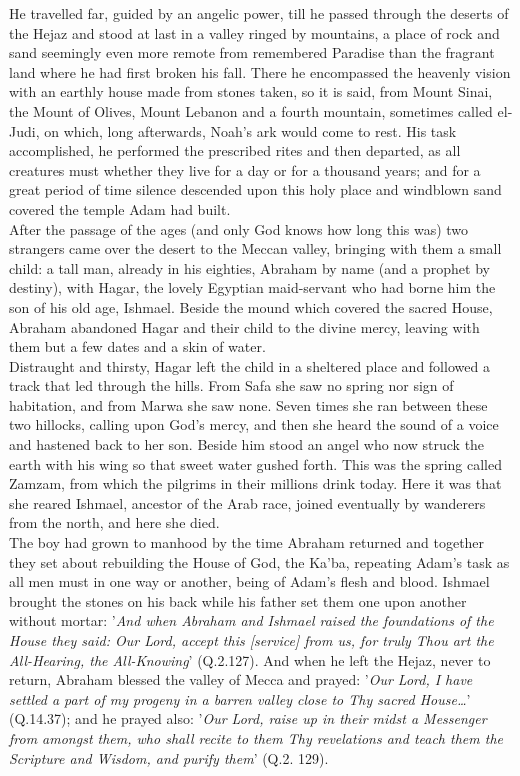 \documentclass[10pt, twoside,openright]{book}
\begin{document}
He travelled far, guided by an angelic power, till he passed through the deserts of the Hejaz and 
stood at last in a valley ringed by mountains, a place of rock and sand seemingly even more remote 
from remembered Paradise than the fragrant land where he had first broken his fall. There he 
encompassed the heavenly vision with an earthly house made from stones taken, so it is said, from 
Mount Sinai, the Mount of Olives, Mount Lebanon and a fourth mountain, sometimes called el\hyp{}Judi, on 
which, long afterwards, Noah's ark would come to rest. His task accomplished, he performed the 
prescribed rites and then departed, as all creatures must whether they live for a day or for a 
thousand years; and for a great period of time silence descended upon this holy place and windblown sand covered the temple Adam had built. \\

After the passage of the ages (and only God knows how long this was) two strangers came over the 
desert to the Meccan valley, bringing with them a small child: a tall man, already in his eighties, 
Abraham by name (and a prophet by destiny), with Hagar, the lovely Egyptian maid\hyp{}servant who had 
borne him the son of his old age, Ishmael. Beside the mound which covered the sacred House, Abraham 
abandoned Hagar and their child to the divine mercy, leaving with them but a few dates and a skin of 
water. \\

Distraught and thirsty, Hagar left the child in a sheltered place and followed a track that led 
through the hills. From Safa she saw no spring nor sign of habitation, and from Marwa she saw none. 
Seven times she ran between these two hillocks, calling upon God's mercy, and then she heard the 
sound of a voice and hastened back to her son. Beside him stood an angel who now struck the earth 
with his wing so that sweet water gushed forth. This was the spring called Zamzam, from which the 
pilgrims in their millions drink today. Here it was that she reared Ishmael, ancestor of the Arab 
race, joined eventually by wanderers from the north, and here she died. \\

The boy had grown to manhood by the time Abraham returned and together they set about rebuilding the 
House of God, the Ka'ba, repeating Adam's task as all men must in one way or another, being of Adam's 
flesh and blood. Ishmael brought the stones on his back while his father set them one upon another 
without mortar: '\emph{And when Abraham and Ishmael raised the foundations of the House they said: Our Lord, accept this [service] from us, for truly Thou art the All\hyp{}Hearing, the All\hyp{}Knowing}' (Q.2.127). 
And when he left the Hejaz, never to return, Abraham blessed the valley of Mecca and prayed: '\emph{Our Lord, I have settled a part of my progeny in a barren valley close to Thy sacred House\ldots{}}' (Q.14.37); and he prayed also: '\emph{Our Lord, raise up in their midst a Messenger from amongst them, who shall recite to them Thy revelations and teach them the Scripture and Wisdom, and purify them}' (Q.2. 129). \\
\end{document}
